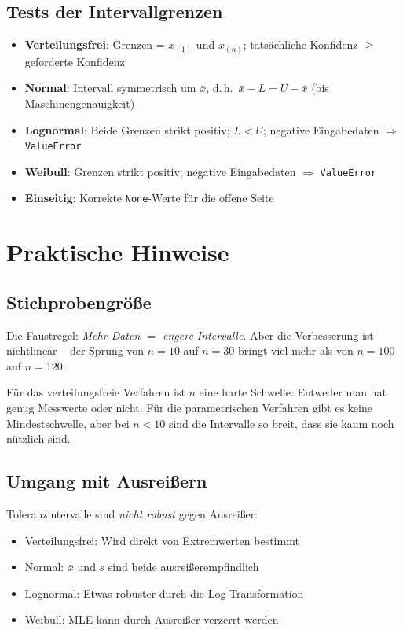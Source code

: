 \documentclass[10pt,a4paper,twocolumn]{article}
\theoremstyle{definition}
\newcommand{\xbar}{\bar{x}}
\begin{document}
\subsection{Tests der Intervallgrenzen}

\begin{itemize}[nosep,leftmargin=*]
    \item \textbf{Verteilungsfrei}: Grenzen = $x_{(1)}$ und $x_{(n)}$;
          tatsächliche Konfidenz $\geq$ geforderte Konfidenz
    \item \textbf{Normal}: Intervall symmetrisch um $\xbar$, d.\,h.\
          $\xbar - L = U - \xbar$ (bis Maschinengenauigkeit)
    \item \textbf{Lognormal}: Beide Grenzen strikt positiv; $L < U$;
          negative Eingabedaten $\Rightarrow$ \texttt{ValueError}
    \item \textbf{Weibull}: Grenzen strikt positiv;
          negative Eingabedaten $\Rightarrow$ \texttt{ValueError}
    \item \textbf{Einseitig}: Korrekte \texttt{None}-Werte für die
          offene Seite
\end{itemize}


\section{Praktische Hinweise}
\label{sec:praxis}

\subsection{Stichprobengröße}

Die Faustregel: \emph{Mehr Daten $=$ engere Intervalle}.
Aber die Verbesserung ist nichtlinear -- der Sprung von $n=10$
auf $n=30$ bringt viel mehr als von $n=100$ auf $n=120$.

Für das verteilungsfreie Verfahren ist $n$ eine harte Schwelle:
Entweder man hat genug Messwerte oder nicht.
Für die parametrischen Verfahren gibt es keine Mindestschwelle,
aber bei $n < 10$ sind die Intervalle so breit, dass sie kaum
noch nützlich sind.

\subsection{Umgang mit Ausreißern}

Toleranzintervalle sind \emph{nicht robust} gegen Ausreißer:
\begin{itemize}[nosep,leftmargin=*]
    \item Verteilungsfrei: Wird direkt von Extremwerten bestimmt
    \item Normal: $\xbar$ und $s$ sind beide ausreißerempfindlich
    \item Lognormal: Etwas robuster durch die Log-Transformation
    \item Weibull: MLE kann durch Ausreißer verzerrt werden
\end{itemize}
\end{document}
